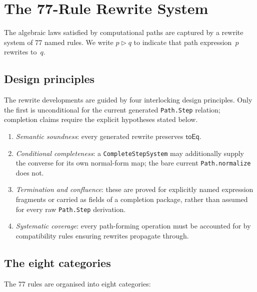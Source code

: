 \documentclass[manuscript]{BSLstyle}
\begin{document}
\section{The 77-Rule Rewrite System}\label{sec:rewrite}

The algebraic laws satisfied by computational paths are captured by a
rewrite system of 77 named rules.  We write $p \triangleright q$ to
indicate that path expression~$p$ rewrites to~$q$.

\subsection{Design principles}

The rewrite developments are guided by four interlocking design principles.
Only the first is unconditional for the current generated \texttt{Path.Step}
relation; completion claims require the explicit hypotheses stated below.
\begin{enumerate}
\item \emph{Semantic soundness}: every generated rewrite preserves
  \(\mathsf{toEq}\).
\item \emph{Conditional completeness}: a \texttt{CompleteStepSystem} may additionally
  supply the converse for its own normal-form map; the bare current
  \texttt{Path.normalize} does not.
\item \emph{Termination and confluence}: these are proved for explicitly named
  expression fragments or carried as fields of a completion package, rather
  than assumed for every raw \texttt{Path.Step} derivation.
\item \emph{Systematic coverage}: every path-forming operation must be
  accounted for by compatibility rules ensuring rewrites propagate through.
\end{enumerate}

\subsection{The eight categories}

The 77 rules are organised into eight categories:
\end{document}
